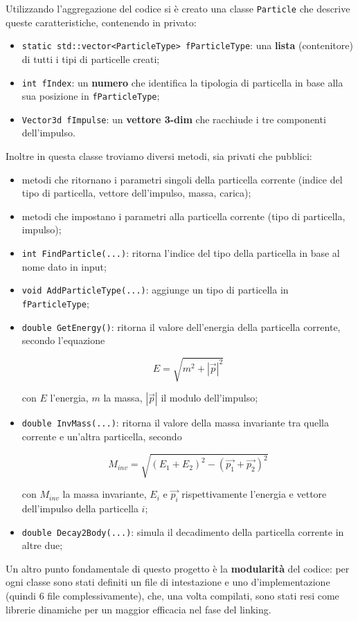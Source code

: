 Utilizzando l'aggregazione del codice si è creato una classe \verb|Particle| che descrive queste caratteristiche, contenendo in privato:
\begin{itemize}
    \item \verb|static std::vector<ParticleType> fParticleType|: una \textbf{lista} (contenitore) di tutti i tipi di particelle creati;
    \item \verb|int fIndex|: un \textbf{numero} che identifica la tipologia di particella in base alla sua posizione in \verb|fParticleType|;
    \item \verb|Vector3d fImpulse|: un \textbf{vettore 3-dim} che racchiude i tre componenti dell'impulso.
\end{itemize}
Inoltre in questa classe troviamo diversi metodi, sia privati che pubblici:
\begin{itemize}
    \item metodi che ritornano i parametri singoli della particella corrente (indice del tipo di particella, vettore dell'impulso, massa, carica);
    \item metodi che impostano i parametri alla particella corrente (tipo di particella, impulso);
    \item \verb|int FindParticle(...)|: ritorna l'indice del tipo della particella in base al nome dato in input;
    \item \verb|void AddParticleType(...)|: aggiunge un tipo di particella in \verb|fParticleType|;
    \item \verb|double GetEnergy()|: ritorna il valore dell'energia della particella corrente, secondo l'equazione
    
    $$ E = \sqrt{m^2 + |\Vec{p}|^2} $$
    
    con $E$ l'energia, $m$ la massa, $|\Vec{p}|$ il modulo dell'impulso;
    \item \verb|double InvMass(...)|: ritorna il valore della massa invariante tra quella corrente e un'altra particella, secondo
    
    $$ M_{inv} = \sqrt{(E_1 + E_2)^2 - (\vec{p_1} + \vec{p_2})^2} $$
    
    con $M_{inv}$ la massa invariante, $E_i$ e $\Vec{p_i}$ rispettivamente l'energia e vettore dell'impulso della particella $i$;
    \item \verb|double Decay2Body(...)|: simula il decadimento della particella corrente in altre due; 
\end{itemize}

Un altro punto fondamentale di questo progetto è la \textbf{modularità} del codice: per ogni classe sono stati definiti un file di intestazione e uno d'implementazione (quindi 6 file complessivamente), che, una volta compilati, sono stati resi come librerie dinamiche per un maggior efficacia nel fase del linking.\\

